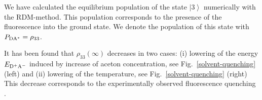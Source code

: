\documentclass[12pt,twoside,a4paper]{report}
\begin{document}

We have calculated the equilibrium population 
of the state $\left| 3 \right\rangle $
numerically 
with the  RDM-method.
This population 
corresponds to the presence of
the fluorescence into the ground state. 
We denote the population of this state with 
$P_{\rm DA^*}=\rho_{33}$.








It has been found 
that 
$\rho_{33}(\infty)$
decreases in two cases: 
(i)  lowering of the energy $E_{\rm D^+A^-}$ 
     induced by increase of aceton concentration, 
     see Fig.~\ref{solvent-quenching} (left) 
     and 
(ii) lowering of the temperature, see Fig.~\ref{solvent-quenching} (right)
     This decrease corresponds to the experimentally observed 
     fluorescence quenching \cite{will98}. 

 
\end{document}
